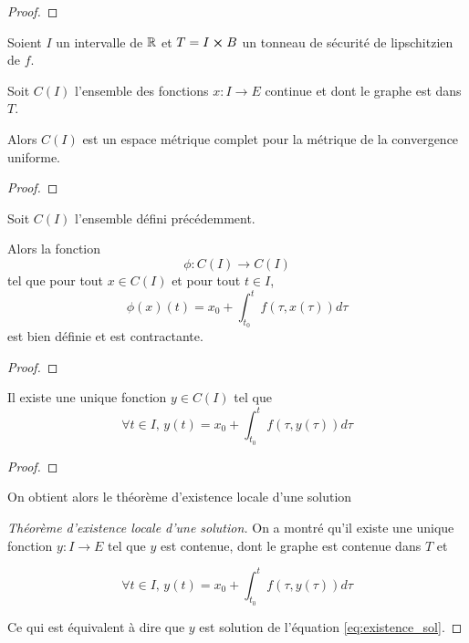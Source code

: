 \documentclass[a4paper, 11pt]{report}
\begin{document}
\ifdefined\outputproof
\begin{proof}

\end{proof}
\fi

\begin{proposition}
	Soient $I$ un intervalle de $\mathbb{R}$ et $T = I \cross B$ un tonneau de
	sécurité de lipschitzien de $f$.

	Soit $C(I)$ l'ensemble des fonctions $x
	: I \rightarrow E$ continue et dont le graphe est dans $T$.

	Alors $C(I)$ est un espace métrique complet pour la métrique de la
	convergence uniforme.
\end{proposition}

\ifdefined\outputproof
\begin{proof}

\end{proof}
\fi

\begin{proposition}
	Soit $C(I)$ l'ensemble défini précédemment.

	Alors la fonction
	\begin{equation}
		\phi : C(I) \rightarrow C(I)
	\end{equation}
	tel que pour tout $x \in C(I)$ et pour tout $t \in I$,
	\begin{equation}
		\phi(x)(t) = x_{0} + \int_{t_{0}}^{t} f(\tau, x(\tau)) d\tau
	\end{equation}
	est bien définie et est contractante.
\end{proposition}

\ifdefined\outputproof
\begin{proof}

\end{proof}
\fi

\begin{corollary}
	Il existe une unique fonction $y \in C(I)$ tel que
	\begin{equation}
		\forall t \in I, \, y(t) = x_{0} + \int_{t_{0}}^{t} f(\tau, y(\tau))
		d\tau
	\end{equation}
\end{corollary}

\ifdefined\outputproof
\begin{proof}

\end{proof}
\fi

On obtient alors le théorème d'existence locale d'une solution

\ifdefined\outputproof
\begin{proof} [Théorème d'existence locale d'une solution]
	On a montré qu'il existe une unique fonction $y : I \rightarrow E$ tel que
	$y$ est contenue, dont le graphe est contenue dans $T$ et

	\begin{equation}
		\forall t \in I, \, y(t) = x_{0} + \int_{t_{0}}^{t} f(\tau, y(\tau))
		d\tau
	\end{equation}

	Ce qui est équivalent à dire que $y$ est solution de l'équation
	\ref{eq:existence_sol}.
\end{proof}
\fi
\end{document}
